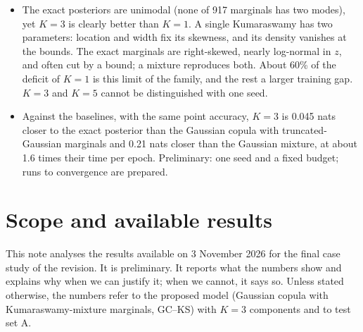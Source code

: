 \documentclass[11pt]{article}
\begin{document}
\begin{itemize}
bearings positive) and agree with the exact posteriors. The dependence is modest (0.3 nats), and on these test sets it
does not raise the joint density at the true parameters.
\item The exact posteriors are unimodal (none of 917 marginals has two modes), yet $K=3$ is clearly better than $K=1$. A
single Kumaraswamy has two parameters: location and width fix its skewness, and its density vanishes at the bounds. The
exact marginals are right-skewed, nearly log-normal in $z$, and often cut by a bound; a mixture reproduces both. About
60\% of the deficit of $K=1$ is this limit of the family, and the rest a larger training gap. $K=3$ and $K=5$ cannot be
distinguished with one seed.
\item Against the baselines, with the same point accuracy, $K=3$ is 0.045 nats closer to the exact posterior than the
Gaussian copula with truncated-Gaussian marginals and 0.21 nats closer than the Gaussian mixture, at about 1.6 times their
time per epoch. Preliminary: one seed and a fixed budget; runs to convergence are prepared.
\end{itemize}

\section{Scope and available results}
This note analyses the results available on 3 November 2026 for the final case study of the revision. It is
preliminary. It reports what the numbers show and explains why when we can justify it; when we cannot, it says so.
Unless stated otherwise, the numbers refer to the proposed model (Gaussian copula with Kumaraswamy-mixture marginals,
GC--KS) with $K=3$ components and to test set A.
\end{document}
